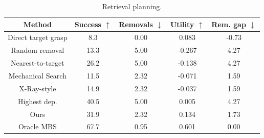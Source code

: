 \begin{table}[htbp]
  \centering
  \caption{Retrieval planning.}
  \label{tab:stage3_planning_main}
  \small
  \setlength{\tabcolsep}{4.0pt}
  \begin{tabular}{ccccc}
    \toprule
    Method & Success $\uparrow$ & Removals $\downarrow$ & Utility $\uparrow$ & Rem. gap $\downarrow$ \\
    \midrule
    Direct target grasp & 8.3 & 0.00 & 0.083 & -0.73 \\
    Random removal & 13.3 & 5.00 & -0.267 & 4.27 \\
    Nearest-to-target & 26.2 & 5.00 & -0.138 & 4.27 \\
    Mechanical Search & 11.5 & 2.32 & -0.071 & 1.59 \\
    X-Ray-style & 14.9 & 2.32 & -0.037 & 1.59 \\
    Highest dep. & 40.5 & 5.00 & 0.005 & 4.27 \\
    Ours & 31.9 & 2.32 & 0.134 & 1.73 \\
    Oracle MBS & 67.7 & 0.95 & 0.601 & 0.00 \\
    \bottomrule
  \end{tabular}
  \vspace{2pt}
  \begin{minipage}{0.95\linewidth}
    
  \end{minipage}
\end{table}
